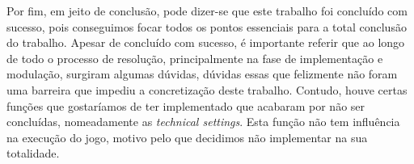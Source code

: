 \documentclass[a4paper,11pt]{article}
\begin{document}
\vspace{8pt}

Por fim, em jeito de conclusão, pode dizer-se que este trabalho foi concluído com sucesso, pois conseguimos focar todos os pontos essenciais para a total conclusão do trabalho. Apesar de concluído com sucesso, é importante referir que ao longo de todo o processo de resolução, principalmente na fase de implementação e modulação, surgiram algumas dúvidas, dúvidas essas que felizmente não foram uma barreira que impediu a concretização deste trabalho. Contudo, houve certas funções que gostaríamos de ter implementado que acabaram por não ser concluídas, nomeadamente as \textit{technical settings}. Esta função não tem influência na execução do jogo, motivo pelo que decidimos não implementar na sua totalidade.

\pagebreak

\appendix

\printbibliography[title={Referências Bibliográficas}]


\pagebreak
\end{document}
